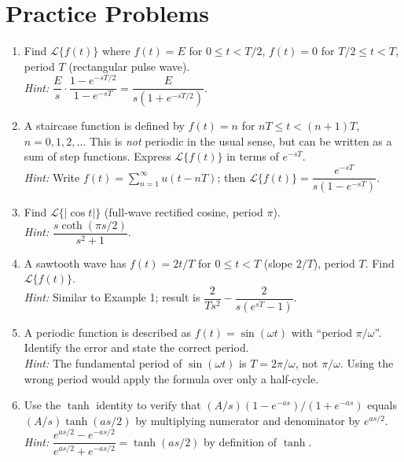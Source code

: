 \documentclass[12pt,a4paper]{article}
\begin{document}
\section{Practice Problems}

\begin{enumerate}[label=\textbf{P\arabic*.}, leftmargin=*, itemsep=8pt]

\item Find $\mathcal{L}\{f(t)\}$ where $f(t) = E$ for $0 \leq t < T/2$,
  $f(t) = 0$ for $T/2 \leq t < T$, period $T$ (rectangular pulse wave). \\
  \textit{Hint:} $\dfrac{E}{s} \cdot \dfrac{1-e^{-sT/2}}{1-e^{-sT}}
  = \dfrac{E}{s(1+e^{-sT/2})}$.

\item A staircase function is defined by $f(t) = n$ for $nT \leq t < (n+1)T$,
  $n = 0, 1, 2, \ldots$  This is \emph{not} periodic in the usual sense,
  but can be written as a sum of step functions.  Express
  $\mathcal{L}\{f(t)\}$ in terms of $e^{-sT}$. \\
  \textit{Hint:} Write $f(t) = \sum_{n=1}^\infty u(t - nT)$; then
  $\mathcal{L}\{f(t)\} = \dfrac{e^{-sT}}{s(1-e^{-sT})}$.

\item Find $\mathcal{L}\{|\cos t|\}$ (full-wave rectified cosine, period
  $\pi$). \\
  \textit{Hint:} $\dfrac{s\coth(\pi s/2)}{s^2+1}$.

\item A sawtooth wave has $f(t) = 2t/T$ for $0 \leq t < T$ (slope $2/T$),
  period $T$.  Find $\mathcal{L}\{f(t)\}$. \\
  \textit{Hint:} Similar to Example 1; result is
  $\dfrac{2}{Ts^2} - \dfrac{2}{s(e^{sT}-1)}$.

\item A periodic function is described as $f(t) = \sin(\omega t)$ with
  ``period $\pi/\omega$''.  Identify the error and state the correct period. \\
  \textit{Hint:} The fundamental period of $\sin(\omega t)$ is
  $T = 2\pi/\omega$, not $\pi/\omega$.  Using the wrong period would apply
  the formula over only a half-cycle.

\item Use the $\tanh$ identity to verify that $(A/s)(1-e^{-as})/(1+e^{-as})$
  equals $(A/s)\tanh(as/2)$ by multiplying numerator and denominator by
  $e^{as/2}$. \\
  \textit{Hint:}
  $\dfrac{e^{as/2}-e^{-as/2}}{e^{as/2}+e^{-as/2}} = \tanh(as/2)$
  by definition of $\tanh$.

\end{enumerate}
\end{document}
